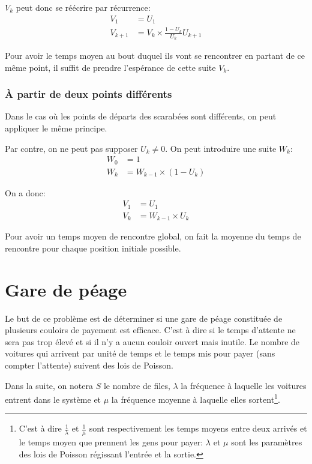 \documentclass{scrartcl}
\begin{document}
      $V_k$ peut donc se réécrire par récurrence:
        \begin{align*}
          V_1       &= U_1 \\
          V_{k + 1} &= V_k \times \frac{1 - U_k}{U_k}U_{k + 1}
        \end{align*}

      Pour avoir le temps moyen au bout duquel ils vont se rencontrer en
      partant de ce même point, il suffit de prendre l'espérance de cette suite
      $V_k$. %

    \subsubsection{À partir de deux points différents}
      Dans le cas où les points de départs des scarabées sont différents, on peut
      appliquer le même principe.

      Par contre, on ne peut pas supposer $U_k \neq 0$.
      On peut introduire une suite $W_k$:
      \begin{align*}
        W_0 &= 1 \\
        W_k &= W_{k-1} \times (1 - U_k)
      \end{align*}

      On a donc:
      \begin{align*}
        V_1  &= U_1 \\
        V_k &= W_{k-1} \times U_k
      \end{align*}

      Pour avoir un temps moyen de rencontre global, on fait la moyenne du temps
      de rencontre pour chaque position initiale possible. %

\section{Gare de péage}
  Le but de ce problème est de déterminer si une gare de péage constituée de
  plusieurs couloirs de payement est efficace. C'est à dire si le temps
  d'attente ne sera pas trop élevé et si il n'y a aucun couloir ouvert mais
  inutile. Le nombre de voitures qui arrivent par unité de temps et le temps
  mis pour payer (sans compter l'attente) suivent des lois de Poisson.

  Dans la suite, on notera $S$ le nombre de files, $\lambda$ la fréquence à
  laquelle les voitures entrent dans le système et $\mu$ la fréquence moyenne à
  laquelle elles sortent\footnote{C'est à dire $\frac 1 \lambda$ et
  $\frac 1 \mu$ sont respectivement les temps moyens entre deux arrivés et le
  temps moyen que prennent les gens pour payer: $\lambda$ et $\mu$ sont les
  paramètres des lois de Poisson régissant l'entrée et la sortie.}.
\end{document}
